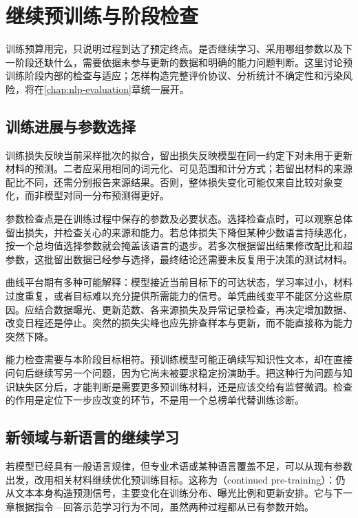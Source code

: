 \section{继续预训练与阶段检查}
\label{sec:nlp-llm-continuation}

训练预算用完，只说明过程到达了预定终点。是否继续学习、采用哪组参数以及下一阶段还缺什么，需要依据未参与更新的数据和明确的能力问题判断。这里讨论预训练阶段内部的检查与适应；怎样构造完整评价协议、分析统计不确定性和污染风险，将在\ref{chap:nlp-evaluation}章统一展开。

\subsection{训练进展与参数选择}
\label{sec:nlp-llm-checkpoints}

训练损失反映当前采样批次的拟合，留出损失反映模型在同一约定下对未用于更新材料的预测。二者应采用相同的词元化、可见范围和计分方式；若留出材料的来源配比不同，还需分别报告来源结果。否则，整体损失变化可能仅来自比较对象变化，而非模型对同一分布预测得更好。

参数检查点是在训练过程中保存的参数及必要状态。选择检查点时，可以观察总体留出损失，并检查关心的来源和能力。若总体损失下降但某种少数语言持续恶化，按一个总均值选择参数就会掩盖该语言的退步。若多次根据留出结果修改配比和超参数，这批留出数据已经参与选择，最终结论还需要未反复用于决策的测试材料。

曲线平台期有多种可能解释：模型接近当前目标下的可达状态，学习率过小，材料过度重复，或者目标难以充分提供所需能力的信号。单凭曲线变平不能区分这些原因。应结合数据曝光、更新范数、各来源损失及异常记录检查，再决定增加数据、改变日程还是停止。突然的损失尖峰也应先排查样本与更新，而不能直接称为能力突然下降。

能力检查需要与本阶段目标相符。预训练模型可能正确续写知识性文本，却在直接问句后继续写另一个问题，因为它尚未被要求稳定扮演助手。把这种行为问题与知识缺失区分后，才能判断是需要更多预训练材料，还是应该交给有监督微调。检查的作用是定位下一步应改变的环节，不是用一个总榜单代替训练诊断。

\subsection{新领域与新语言的继续学习}
\label{sec:nlp-llm-domain-continuation}

若模型已经具有一般语言规律，但专业术语或某种语言覆盖不足，可以从现有参数出发，改用相关材料继续优化预训练目标。这称为（continued pre-training）：仍从文本本身构造预测信号，主要变化在训练分布、曝光比例和更新安排。它与下一章根据指令—回答示范学习行为不同，虽然两种过程都从已有参数开始。

